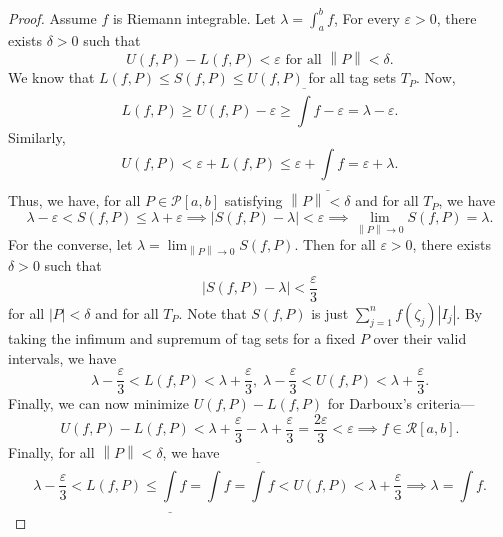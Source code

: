 \documentclass[15pt,a4paper]{book}
\theoremstyle{definition}
\newcommand{\abs}[1]{\left| #1 \right|} %
\newcommand{\cP}{\mathcal{P}}
\newcommand{\cR}{\mathcal{R}}
\newcommand{\norm}[1]{\left\lVert#1\right\rVert}
\begin{document}
\begin{proof}
    Assume $f$ is Riemann integrable. Let $\lambda = \int_{a}^{b} f$, For every $\varepsilon > 0$, there exists $\delta > 0$ such that
    \begin{equation*}
        U(f,P) - L(f,P) < \varepsilon \text{ for all } \norm{P} < \delta.
    \end{equation*}
    We know that $L(f,P) \leq S(f,P) \leq U(f,P)$ for all tag sets $T_{P}$. Now,
    \begin{equation}
        L(f,P) \geq U(f,P) - \varepsilon \geq \overline{\int} f - \varepsilon = \lambda - \varepsilon.
    \end{equation}
    Similarly,
    \begin{equation}
        U(f,P) < \varepsilon + L(f,P) \leq \varepsilon + \underline{\int} f = \varepsilon + \lambda.
    \end{equation}
    Thus, we have, for all $P \in \cP[a,b]$ satisfying $\norm{P} < \delta$ and for all $T_{P}$, we have
    \begin{equation*}
        \lambda - \varepsilon < S(f,P) \leq \lambda + \varepsilon \implies \abs{S(f,P) - \lambda} < \varepsilon \implies \lim_{\norm{P} \to 0} S(f,P) = \lambda.
    \end{equation*}
    For the converse, let $\lambda = \lim_{\norm{P} \to 0} S(f,P)$. Then for all $\varepsilon > 0$, there exists $\delta > 0$ such that
    \begin{equation*}
        \abs{S(f,P) - \lambda} < \frac{\varepsilon}{3}
    \end{equation*}
    for all $\abs{P} < \delta$ and for all $T_{P}$. Note that $S(f,P)$ is just $\sum_{j=1}^{n} f(\zeta_{j}) \abs{I_{j}}$. By taking the infimum and supremum of tag sets for a fixed $P$ over their valid intervals, we have
    \begin{equation}
        \lambda-\frac{\varepsilon}{3} < L(f,P) < \lambda + \frac{\varepsilon}{3}, \; \lambda - \frac{\varepsilon}{3} < U(f,P) < \lambda + \frac{\varepsilon}{3}.
    \end{equation}
    Finally, we can now minimize $U(f,P) - L(f,P)$ for Darboux's criteria---
    \begin{equation}
        U(f,P) - L(f,P) < \lambda+\frac{\varepsilon}{3} - \lambda + \frac{\varepsilon}{3} = \frac{2\varepsilon}{3} < \varepsilon \implies f \in \cR[a,b].
    \end{equation}
    Finally, for all $\norm{P} < \delta$, we have
    \begin{equation}
        \lambda - \frac{\varepsilon}{3} < L(f,P) \leq \underline{\int}f = \int f = \overline{\int}f < U(f,P) < \lambda + \frac{\varepsilon}{3} \implies \lambda = \int f.
    \end{equation}
\end{proof}
\end{document}
